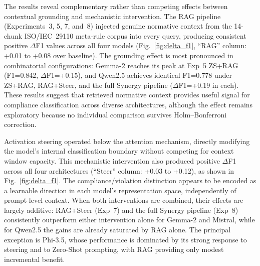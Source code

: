 \documentclass{ieeeaccess}
\begin{document}
The results reveal complementary rather than competing effects between contextual grounding and mechanistic intervention. The RAG pipeline (Experiments~3, 5, 7, and~8) injected genuine normative context from the 14-chunk ISO/IEC~29110 meta-rule corpus into every query, producing consistent positive $\Delta$F1 values across all four models (Fig.~\ref{fig:delta_f1}, ``RAG'' column: +0.01 to +0.08 over baseline). The grounding effect is most pronounced in combinatorial configurations: Gemma-2 reaches its peak at Exp~5 ZS+RAG (F1=0.842, $\Delta$F1=+0.15), and Qwen2.5 achieves identical F1=0.778 under ZS+RAG, RAG+Steer, and the full Synergy pipeline ($\Delta$F1=+0.19 in each). These results suggest that retrieved normative context provides useful signal for compliance classification across diverse architectures, although the effect remains exploratory because no individual comparison survives Holm--Bonferroni correction.

Activation steering operated below the attention mechanism, directly modifying the model's internal classification boundary without competing for context window capacity. This mechanistic intervention also produced positive $\Delta$F1 across all four architectures (``Steer'' column: +0.03 to +0.12), as shown in Fig.~\ref{fig:delta_f1}. The compliance/violation distinction appears to be encoded as a learnable direction in each model's representation space, independently of prompt-level context. When both interventions are combined, their effects are largely additive: RAG+Steer (Exp~7) and the full Synergy pipeline (Exp~8) consistently outperform either intervention alone for Gemma-2 and Mistral, while for Qwen2.5 the gains are already saturated by RAG alone. The principal exception is Phi-3.5, whose performance is dominated by its strong response to steering and to Zero-Shot prompting, with RAG providing only modest incremental benefit.
\end{document}
